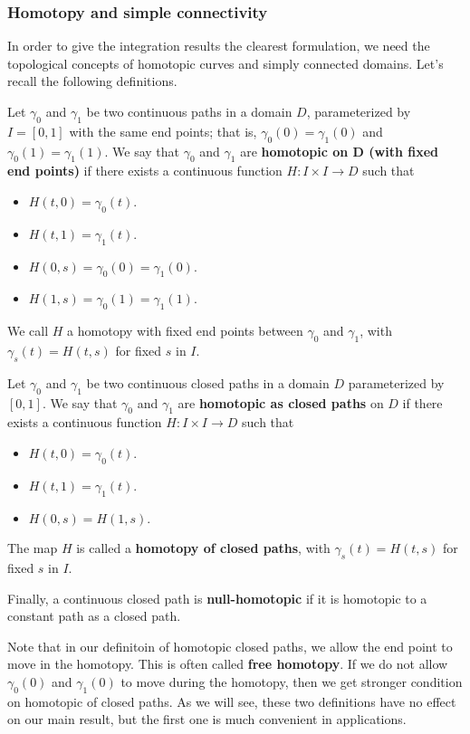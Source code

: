 \subsubsection{Homotopy and simple connectivity}
In order to give the integration results the clearest formulation, we need the topological concepts of homotopic curves and simply connected domains. Let's recall the following definitions.
\begin{definition}
Let $\gamma_0$ and $\gamma_1$ be two continuous paths in a domain $D$, parameterized by $I=[0,1]$ with the same end points; that is, $\gamma_0(0)=\gamma_1(0)$ and $\gamma_0(1)=\gamma_1(1)$. We say that $\gamma_0$ and $\gamma_1$ are \textbf{homotopic on $\bm{D}$ (with fixed end points)} if there exists a continuous function $H:I\times I\to D$ such that
\begin{itemize}
\item $H(t,0)=\gamma_0(t)$.
\item $H(t,1)=\gamma_1(t)$.
\item $H(0,s)=\gamma_0(0)=\gamma_1(0)$.
\item $H(1,s)=\gamma_0(1)=\gamma_1(1)$.
\end{itemize}
We call $H$ a homotopy with fixed end points between $\gamma_0$ and $\gamma_1$, with $\gamma_s(t)=H(t,s)$ for fixed $s$ in $I$.\par
Let $\gamma_0$ and $\gamma_1$ be two continuous closed paths in a domain $D$ parameterized by $[0,1]$. We say that $\gamma_0$ and $\gamma_1$ are \textbf{homotopic as closed paths} on $D$ if there exists a continuous function $H:I\times I\to D$ such that
\begin{itemize}
\item $H(t,0)=\gamma_0(t)$.
\item $H(t,1)=\gamma_1(t)$.
\item $H(0,s)=H(1,s)$.
\end{itemize}
The map $H$ is called a \textbf{homotopy of closed paths}, with $\gamma_s(t)=H(t,s)$ for fixed $s$ in $I$.\par
Finally, a continuous closed path is \textbf{null-homotopic} if it is homotopic to a constant path as a closed path. 
\end{definition}
\begin{remark}
Note that in our definitoin of homotopic closed paths, we allow the end point to move in the homotopy. This is often called \textbf{free homotopy}. If we do not allow $\gamma_0(0)$ and $\gamma_1(0)$ to move during the homotopy, then we get stronger condition on homotopic of closed paths. As we will see, these two definitions have no effect on our main result, but the first one is much convenient in applications.
\end{remark}
